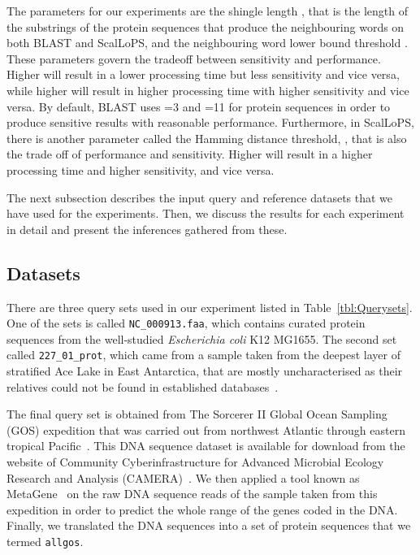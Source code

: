 \documentclass[titlepage]{csetr}
\begin{document}
The parameters for our experiments are the shingle length , that is the length of the substrings of the protein sequences that produce the neighbouring words on both BLAST and ScalLoPS, and the neighbouring word lower bound threshold . These parameters govern the tradeoff between sensitivity and performance. Higher  will result in a lower processing time but less sensitivity and vice versa, while higher  will result in higher processing time with higher sensitivity and vice versa. By default, BLAST uses =3 and =11 for protein sequences in order to produce sensitive results with reasonable performance. Furthermore, in ScalLoPS, there is another parameter called the Hamming distance threshold, , that is also the trade off of performance and sensitivity. Higher  will result in a higher processing time and higher sensitivity, and vice versa.

The next subsection describes the input query and reference datasets that we have used for the experiments. Then, we discuss the results for each experiment in detail and present the inferences gathered from these.

\subsection{Datasets}

There are three query sets used in our experiment listed in Table~\ref{tbl:Querysets}. One of the sets is called \texttt{NC\_000913.faa}, which contains curated protein sequences from the well-studied \emph{Escherichia coli} K12 MG1655. The second set called \texttt{227\_01\_prot}, which came from a sample taken from the deepest layer of stratified Ace Lake in East Antarctica, that are mostly uncharacterised as their relatives could not be found in established databases~\cite{227}.

The final query set is obtained from The Sorcerer II Global Ocean Sampling (GOS) expedition that was carried out from northwest Atlantic through eastern tropical Pacific~\cite{GOS}. This DNA sequence dataset is available for download from the website of Community Cyberinfrastructure for Advanced Microbial Ecology Research and Analysis (CAMERA)~\cite{CAMERA}. We then applied a tool known as MetaGene~\cite{Metagene} on the raw DNA sequence reads of the sample taken from this expedition in order to predict the whole range of the genes coded in the DNA. Finally, we translated the DNA sequences into a set of protein sequences that we termed \texttt{allgos}.
\end{document}
